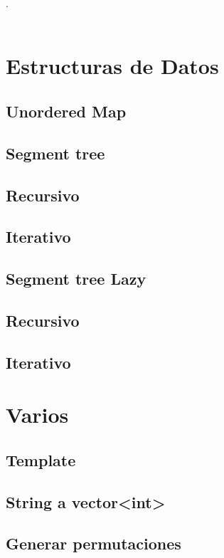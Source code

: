 

\def\title{Competitive Programing Reference}
.\\[0.2cm]
 \\[0.5cm]
\tableofcontents\newpage

\section{Estructuras de Datos}
	\subsection{Unordered Map}
	\subsection{Segment tree}
		\subsection{Recursivo}
			\cppfile{}
		\subsection{Iterativo}
	\subsection{Segment tree Lazy}
			\subsection{Recursivo}
				\cppfile{}
			\subsection{Iterativo}
	

\section{Varios}
	\subsection{Template}
	\subsection{String a vector<int>}
	\subsection{Generar permutaciones}


